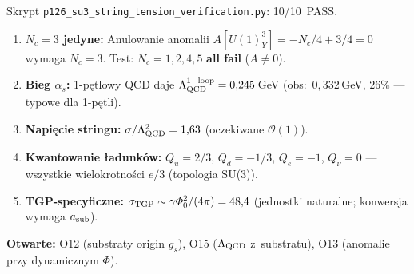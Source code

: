 Skrypt \texttt{p126\_su3\_string\_tension\_verification.py}:
10/10~PASS.

\begin{enumerate}
  \item \textbf{$N_c = 3$ jedyne:} Anulowanie anomalii
    $A[U(1)_Y^3] = -N_c/4 + 3/4 = 0$ wymaga $N_c = 3$.
    Test: $N_c = 1,2,4,5$ \textbf{all fail} ($A \neq 0$).
  \item \textbf{Bieg $\alpha_s$:} 1-p\k{e}tlowy QCD daje
    $\Lambda_{\rm QCD}^{\rm 1-loop} = 0{,}245$\,GeV
    (obs:\ $0{,}332$\,GeV, $26\%$ --- typowe dla 1-p\k{e}tli).
  \item \textbf{Napi\k{e}cie stringu:}
    $\sigma/\Lambda_{\rm QCD}^2 = 1{,}63$ (oczekiwane $\mathcal{O}(1)$).
  \item \textbf{Kwantowanie \l{}adunk\'ow:}
    $Q_u = 2/3$, $Q_d = -1/3$, $Q_e = -1$, $Q_\nu = 0$
    --- wszystkie wielokrotno\'sci $e/3$ (topologia SU(3)).
  \item \textbf{TGP-specyficzne:}
    $\sigma_{\rm TGP} \sim \gamma\Phi_0^2/(4\pi) = 48{,}4$
    (jednostki naturalne; konwersja wymaga $a_{\rm sub}$).
\end{enumerate}

\noindent
\textbf{Otwarte:} O12 (substraty origin $g_s$),
O15 ($\Lambda_{\rm QCD}$ z~substratu),
O13 (anomalie przy dynamicznym $\Phi$).
